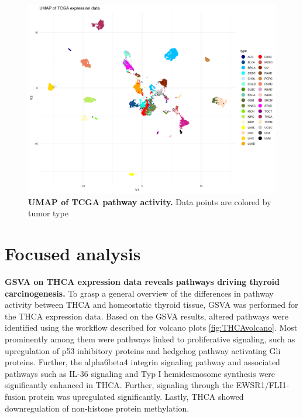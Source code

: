 \documentclass[
  11pt,
  parskip,
  oneside]{scrreprt}
\begin{document}
\begin{figure}

{\centering \includegraphics[width=0.8\linewidth]{figures/Pan Cancer UMAP} 

}

\caption{\textbf{UMAP of TCGA pathway activity.} Data points are colored by tumor type}\label{fig:UMAPPanType}
\end{figure}

\hypertarget{focused-analysis}{%
\section{Focused analysis}\label{focused-analysis}}

\textbf{GSVA on THCA expression data reveals pathways driving thyroid
carcinogenesis.} To grasp a general overview of the differences in
pathway activity between THCA and homeostatic thyroid tissue, GSVA was
performed for the THCA expression data. Based on the GSVA results,
altered pathways were identified using the workflow described for
volcano plots \ref{fig:THCAvolcano}. Most prominently among them were
pathways linked to proliferative signaling, such as upregulation of p53
inhibitory proteins and hedgehog pathway activating Gli proteins.
Further, the alpha6beta4 integrin signaling pathway and associated
pathways such as IL-36 signaling and Typ I hemidesmosome synthesis were
significantly enhanced in THCA. Further, signaling through the
EWSR1/FLI1-fusion protein was upregulated significantly. Lastly, THCA
showed downregulation of non-histone protein methylation.
\end{document}
